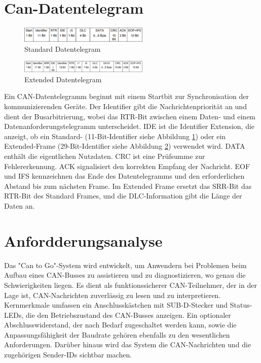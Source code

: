 \section{Can-Datentelegram}
\begin{figure}[h]
    \centering
    \includegraphics[width = 0.55\textwidth]{img/standard_datenframe.png}
    \caption{Standard Datentelegram \cite{3}}
    \label{fig: Standard Datentelegram}
\end{figure}
\begin{figure}[h]
    \centering
    \includegraphics[width = 0.55\textwidth]{img/extended_datenframe.png}
    \caption{Extended Datentelegram \cite{3}}
    \label{fig: Extended Datentelegram}
\end{figure}

\noindent Ein CAN-Datentelegramm beginnt mit einem Startbit zur Synchronisation der kommunizierenden Geräte. Der Identifier gibt die Nachrichtenpriorität an und dient der Busarbitrierung, wobei das RTR-Bit zwischen einem Daten- und einem Datenanforderungstelegramm unterscheidet. IDE ist die Identifier Extension, die anzeigt, ob ein Standard- (11-Bit-Identifier siehe Abbildung \ref{fig: Standard Datentelegram}) oder ein Extended-Frame (29-Bit-Identifier siehe Abbildung \ref{fig: Extended Datentelegram}) verwendet wird. DATA enthält die eigentlichen Nutzdaten. CRC ist eine Prüfsumme zur Fehlererkennung. ACK signalisiert den korrekten Empfang der Nachricht. EOF und IFS kennzeichnen das Ende des Datentelegramms und den erforderlichen Abstand bis zum nächsten Frame. Im Extended Frame ersetzt das SRR-Bit das RTR-Bit des Standard Frames, und die DLC-Information gibt die Länge der Daten an.\\

\section{Anfordderungsanalyse}
\noindent Das "Can to Go"-System wird entwickelt, um Anwendern bei Problemen beim Aufbau eines CAN-Busses zu assistieren und zu diagnostizieren, wo genau die Schwierigkeiten liegen. Es dient als funktionssicherer CAN-Teilnehmer, der in der Lage ist, CAN-Nachrichten zuverlässig zu lesen und zu interpretieren. Kernmerkmale umfassen ein Anschlusskästchen mit SUB-D-Stecker und Status-LEDs, die den Betriebszustand des CAN-Busses anzeigen. Ein optionaler Abschlusswiderstand, der nach Bedarf zugeschaltet werden kann, sowie die Anpassungsfähigkeit der Baudrate gehören ebenfalls zu den wesentlichen Anforderungen. Darüber hinaus wird das System die CAN-Nachrichten und die zugehörigen Sender-IDs sichtbar machen.\\


